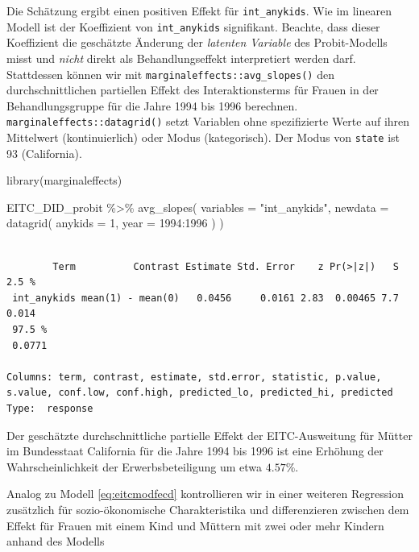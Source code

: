 \documentclass[
  a4paper,
  DIV=11,
  oneside]{scrreprt}
\newenvironment{Shaded}{\begin{snugshade}}{\end{snugshade}}
\newcommand{\AttributeTok}[1]{\textcolor[rgb]{0.40,0.45,0.13}{#1}}
\newcommand{\DecValTok}[1]{\textcolor[rgb]{0.68,0.00,0.00}{#1}}
\newcommand{\FunctionTok}[1]{\textcolor[rgb]{0.28,0.35,0.67}{#1}}
\newcommand{\NormalTok}[1]{\textcolor[rgb]{0.00,0.23,0.31}{#1}}
\newcommand{\SpecialCharTok}[1]{\textcolor[rgb]{0.37,0.37,0.37}{#1}}
\newcommand{\StringTok}[1]{\textcolor[rgb]{0.13,0.47,0.30}{#1}}
\begin{document}
Die Schätzung ergibt einen positiven Effekt für \texttt{int\_anykids}.
Wie im linearen Modell ist der Koeffizient von \texttt{int\_anykids}
signifikant. Beachte, dass dieser Koeffizient die geschätzte Änderung
der \emph{latenten Variable} des Probit-Modells misst und \emph{nicht}
direkt als Behandlungseffekt interpretiert werden darf. Stattdessen
können wir mit \texttt{marginaleffects::avg\_slopes()} den
durchschnittlichen partiellen Effekt des Interaktionsterms für Frauen in
der Behandlungsgruppe für die Jahre 1994 bis 1996 berechnen.
\texttt{marginaleffects::datagrid()} setzt Variablen ohne spezifizierte
Werte auf ihren Mittelwert (kontinuierlich) oder Modus (kategorisch).
Der Modus von \texttt{state} ist 93 (California).

\begin{Shaded}
\begin{Highlighting}[]
\FunctionTok{library}\NormalTok{(marginaleffects)}

\NormalTok{EITC\_DID\_probit }\SpecialCharTok{\%\textgreater{}\%} 
  \FunctionTok{avg\_slopes}\NormalTok{(}
    \AttributeTok{variables =} \StringTok{"int\_anykids"}\NormalTok{, }
    \AttributeTok{newdata =} \FunctionTok{datagrid}\NormalTok{(}
      \AttributeTok{anykids =} \DecValTok{1}\NormalTok{, }
      \AttributeTok{year =} \DecValTok{1994}\SpecialCharTok{:}\DecValTok{1996}
\NormalTok{    )}
\NormalTok{  )}
\end{Highlighting}
\end{Shaded}

\begin{verbatim}

        Term          Contrast Estimate Std. Error    z Pr(>|z|)   S 2.5 %
 int_anykids mean(1) - mean(0)   0.0456     0.0161 2.83  0.00465 7.7 0.014
 97.5 %
 0.0771

Columns: term, contrast, estimate, std.error, statistic, p.value, s.value, conf.low, conf.high, predicted_lo, predicted_hi, predicted 
Type:  response 
\end{verbatim}

Der geschätzte durchschnittliche partielle Effekt der EITC-Ausweitung
für Mütter im Bundesstaat California für die Jahre 1994 bis 1996 ist
eine Erhöhung der Wahrscheinlichkeit der Erwerbsbeteiligung um etwa
\(4.57\%\).

Analog zu Modell \eqref{eq:eitcmodfecd} kontrollieren wir in einer
weiteren Regression zusätzlich für sozio-ökonomische Charakteristika und
differenzieren zwischen dem Effekt für Frauen mit einem Kind und Müttern
mit zwei oder mehr Kindern anhand des Modells
\end{document}
